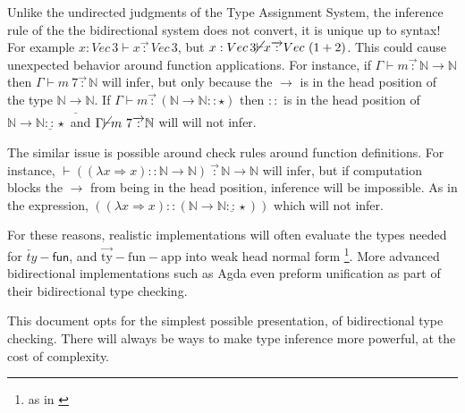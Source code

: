 Unlike the undirected judgments of the Type Assignment System, the inference rule of the the bidirectional system does not convert, it is unique up to syntax! For example $x:Vec\,3\vdash x\overrightarrow{\,:\,}Vec\,3$, but $x:Vec\,3\cancel{\vdash}x\overrightarrow{\,:\,}Vec\,\left(1+2\right)$.
This could cause unexpected behavior around function applications.
For instance, if $\Gamma\vdash m\overrightarrow{\,:\,}\mathbb{N}\rightarrow\mathbb{N}$ then $\Gamma\vdash m\:7\overrightarrow{\,:\,}\mathbb{N}$ will infer, but only because the $\rightarrow$ is in the head position of the type $\mathbb{N}\underline{\rightarrow}\mathbb{N}$.
If $\Gamma\vdash m\overrightarrow{\,:\,}\left(\mathbb{N}\rightarrow\mathbb{N}::\star\right)$ then $::$ is in the head position of $\mathbb{N}\rightarrow\mathbb{N}\underline{::}\star$ and $\Gamma\cancel{\vdash}m\ 7\overrightarrow{\,:\,}\mathbb{N}$ will will not infer.

The similar issue is possible around check rules around function definitions.
For instance, $\vdash\left((\lambda x\Rightarrow x)::\mathbb{N}\rightarrow\mathbb{N}\right)\ \overrightarrow{\,:\,}\mathbb{N}\rightarrow\mathbb{N}$ will infer, but if computation blocks the $\rightarrow$ from being in the head position, inference will be impossible.
As in the expression, $\left((\lambda x\Rightarrow x)::\left(\mathbb{N}\rightarrow\mathbb{N}\underline{::}\star\right)\right)$ which will not infer.


For these reasons, realistic implementations will often evaluate the types needed for $\overleftarrow{ty}-\mathsf{fun}$, and $\operatorname{\overrightarrow{ty}-fun-app}$ into weak head normal form \footnote{as in \cite{COQUAND1996167}}.
More advanced bidirectional implementations such as Agda\cite{norell2007towards} even preform unification as part of their bidirectional type checking.





This document opts for the simplest possible presentation, of bidirectional type checking.
There will always be ways to make type inference more powerful, at the cost of complexity.

